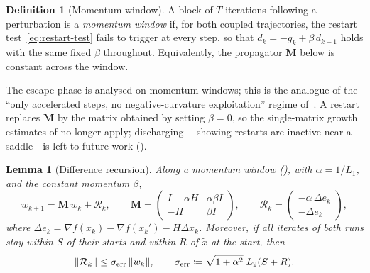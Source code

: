 \documentclass[11pt]{article}
\theoremstyle{plain}
\newtheorem{lemma}{Lemma}[section]
\theoremstyle{definition}
\newtheorem{definition}{Definition}[section]
\theoremstyle{remark}
\DeclarePairedDelimiter{\norm}{\lVert}{\rVert}
\newcommand{\grad}{\nabla}
\newcommand{\Mmat}{\mathbf{M}}
\newcommand{\xt}{\tilde{x}}
\newcommand{\sg}{\sigma_{\mathrm{err}}}
\begin{document}
\begin{definition}[Momentum window]\label{def:window}
A block of $T$ iterations following a perturbation is a \emph{momentum
window} if, for both coupled trajectories, the restart
test~\eqref{eq:restart-test} fails to trigger at every step, so that
$d_{k}=-g_{k}+\beta\,d_{k-1}$ holds with the same fixed $\beta$
throughout. Equivalently, the propagator $\Mmat$ below is constant
across the window.
\end{definition}

\noindent The escape phase is analysed on momentum windows; this is the
analogue of the ``only accelerated steps, no negative-curvature
exploitation'' regime of~\cite{pmlr-v75-jin18a}. A restart replaces $\Mmat$ by
the matrix obtained by setting $\beta=0$, so the single-matrix growth
estimates of  no longer apply; discharging
---showing restarts are inactive near a saddle---is left
to future work ().

\begin{lemma}[Difference recursion]
\label{lem:recurrence}
Along a momentum window (), with $\alpha=1/L_{1}$, and the constant momentum $\beta$,
\begin{equation}\label{eq:recurrence}
  w_{k+1}=\Mmat\,w_{k}+\mathcal{R}_{k},
  \qquad
  \Mmat=\begin{pmatrix}I-\alpha H & \alpha\beta I\\[2pt] -H & \beta I\end{pmatrix},
  \qquad
  \mathcal{R}_{k}=\begin{pmatrix}-\alpha\,\Delta e_{k}\\[2pt]-\Delta e_{k}\end{pmatrix},
\end{equation}
where $\Delta e_{k}=\grad f(x_{k})-\grad f(x_{k}')-H\Delta x_{k}$.
Moreover, if all iterates of both runs stay within $S$ of their starts
and within $R$ of $\xt$ at the start, then
\begin{equation}\label{eq:residual}
  \norm{\mathcal{R}_{k}}\le\sg\,\norm{w_{k}},
  \qquad \sg\coloneqq \sqrt{1+\alpha^{2}}\;L_{2}(S+R).
\end{equation}
\end{lemma}
\end{document}
